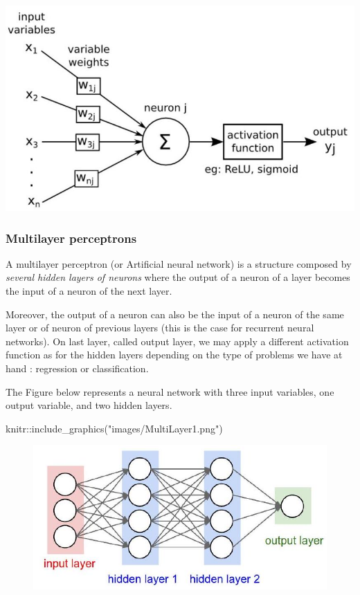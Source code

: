 \documentclass[
  letterpaper,
  DIV=11,
  numbers=noendperiod,
  oneside]{scrartcl}
\newenvironment{Shaded}{\begin{snugshade}}{\end{snugshade}}
\newcommand{\FunctionTok}[1]{\textcolor[rgb]{0.28,0.35,0.67}{#1}}
\newcommand{\NormalTok}[1]{\textcolor[rgb]{0.00,0.23,0.31}{#1}}
\newcommand{\SpecialCharTok}[1]{\textcolor[rgb]{0.37,0.37,0.37}{#1}}
\newcommand{\StringTok}[1]{\textcolor[rgb]{0.13,0.47,0.30}{#1}}
\begin{document}
\includegraphics{images/ArtificialNeuron.png}

\hypertarget{multilayer-perceptrons}{%
\subsubsection{Multilayer perceptrons}\label{multilayer-perceptrons}}

A multilayer perceptron (or Artificial neural network) is a structure
composed by \emph{several hidden layers of neurons} where the output of
a neuron of a layer becomes the input of a neuron of the next layer.

Moreover, the output of a neuron can also be the input of a neuron of
the same layer or of neuron of previous layers (this is the case for
recurrent neural networks). On last layer, called output layer, we may
apply a different activation function as for the hidden layers depending
on the type of problems we have at hand : regression or classification.

The Figure below represents a neural network with three input variables,
one output variable, and two hidden layers.

\begin{Shaded}
\begin{Highlighting}[]
\NormalTok{knitr}\SpecialCharTok{::}\FunctionTok{include\_graphics}\NormalTok{(}\StringTok{"images/MultiLayer1.png"}\NormalTok{)}
\end{Highlighting}
\end{Shaded}

\begin{figure}[H]

{\centering \includegraphics[width=1\textwidth,height=\textheight]{images/MultiLayer1.png}

}

\end{figure}
\end{document}
